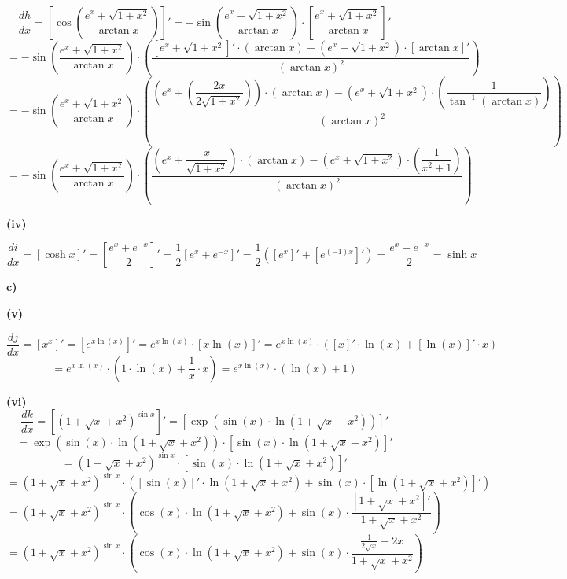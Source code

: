 \documentclass[a4paper,graphics,11pt]{article}
\begin{document}
$$
    \frac{dh}{dx} = \left[\cos\left(\frac{e^x+\sqrt{1+x^2}}{\arctan x}\right)\right]'
    = -\sin\left(\frac{e^x+\sqrt{1+x^2}}{\arctan x}\right) \cdot
        \left[\frac{e^x+\sqrt{1+x^2}}{\arctan x}\right]'
$$$$
    = -\sin\left(\frac{e^x+\sqrt{1+x^2}}{\arctan x}\right) \cdot
        \left(\frac{\left[e^x+\sqrt{1+x^2}\right]'\cdot (\arctan x) -
        (e^x+\sqrt{1+x^2}) \cdot [\arctan x]'}{(\arctan x)^2} \right)
$$$$
    = -\sin\left(\frac{e^x+\sqrt{1+x^2}}{\arctan x}\right) \cdot
        \left(\frac{\left(e^x+\left(\dfrac{2x}{2\sqrt{1+x^2}}\right)\right)\cdot (\arctan x) -
        (e^x+\sqrt{1+x^2}) \cdot \left(\dfrac{1}{\tan^{-1}(\arctan x)}\right)}{(\arctan x)^2} \right)
$$$$
    = -\sin\left(\frac{e^x+\sqrt{1+x^2}}{\arctan x}\right) \cdot
        \left(\frac{\left(e^x+\dfrac{x}{\sqrt{1+x^2}}\right)\cdot (\arctan x) -
        (e^x+\sqrt{1+x^2}) \cdot \left(\dfrac{1}{x^2+1}\right)}{(\arctan x)^2}
        \right)
$$

\textbf{(iv)}

$$
    \frac{di}{dx} = [\cosh x]'
    = \left[\frac{e^x+e^{-x}}{2}\right]'
    = \frac{1}{2} \left[e^x+e^{-x}\right]'
    = \frac{1}{2} \left([e^x]' + [e^{(-1)x}]'\right)
    = \frac{e^x-e^{-x}}{2}
    = \sinh x
$$


\textbf{c)}

\textbf{(v)}

$$
    \frac{dj}{dx} = [x^x]' = \left[e^{x\ln(x)}\right]'
    = e^{x\ln(x)} \cdot [x\ln(x)]'
    = e^{x\ln(x)} \cdot ([x]' \cdot \ln(x) + [\ln(x)]' \cdot x)
$$$$
    = e^{x\ln(x)} \cdot (1 \cdot \ln(x) + \frac{1}{x} \cdot x)
    = e^{x\ln(x)} \cdot (\ln(x) + 1)
$$

\textbf{(vi)}
$$
    \frac{dk}{dx} = \left[\left(1 + \sqrt{x} + x^2\right)^{\sin x}\right]'
    = \left[\exp\left(\sin(x)\cdot \ln\left(1 + \sqrt{x} + x^2\right)\right) \right]'
$$$$
    = \exp\left(\sin(x)\cdot \ln\left(1 + \sqrt{x} + x^2\right)\right)
        \cdot \left[\sin(x)\cdot \ln\left(1 + \sqrt{x} + x^2\right)\right]'
$$$$
    = \left(1+\sqrt{x} + x^2\right)^{\sin x}
        \cdot \left[\sin(x)\cdot \ln\left(1 + \sqrt{x} + x^2\right)\right]'
$$$$
    = \left(1+\sqrt{x} + x^2\right)^{\sin x}
        \cdot \left([\sin(x)]'\cdot \ln\left(1 + \sqrt{x} + x^2\right)
        + \sin(x) \cdot \left[\ln\left(1+\sqrt{x} + x^2\right)\right]'\right)
$$$$
    = \left(1+\sqrt{x} + x^2\right)^{\sin x}
        \cdot \left(\cos(x)\cdot \ln\left(1 + \sqrt{x} + x^2\right)
        + \sin(x) \cdot \frac{[1+\sqrt{x}+x^2]'}{1+\sqrt{x} + x^2}\right)
$$$$
    = \left(1+\sqrt{x} + x^2\right)^{\sin x}
        \cdot \left(\cos(x)\cdot \ln\left(1 + \sqrt{x} + x^2\right)
        + \sin(x) \cdot \frac{\frac{1}{2\sqrt{x}}+2x}{1+\sqrt{x} + x^2}\right)
$$
\end{document}
